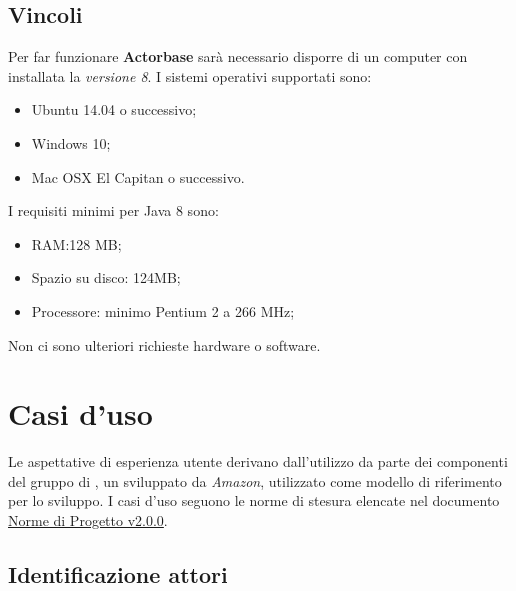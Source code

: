 \documentclass{scalatekids-article}
\begin{document}
\subsection{Vincoli}

Per far funzionare \textbf{Actorbase} sarà necessario disporre di un computer con
installata la \textit{ versione 8}. I sistemi operativi supportati sono:
\begin{itemize}
\item Ubuntu 14.04 o successivo;
\item Windows 10;
\item Mac OSX El Capitan o successivo.
\end{itemize}
I requisiti minimi per Java 8 sono:
\begin{itemize}
\item RAM:\@128 MB;\@
\item Spazio su disco: 124MB;\@
\item Processore: minimo Pentium 2 a 266 MHz;
\end{itemize}
Non ci sono ulteriori richieste hardware o software.

\section{Casi d'uso}

Le aspettative di esperienza utente derivano dall'utilizzo da parte dei
componenti del gruppo di , un 
 sviluppato da \textit{Amazon}, utilizzato come modello di
riferimento per lo sviluppo. I casi d'uso seguono le norme di stesura elencate
nel documento \href{run:../Interni/NormeDiProgetto\_v2.0.0.pdf}{Norme di
  Progetto v2.0.0}.

\subsection{Identificazione attori}
\end{document}
